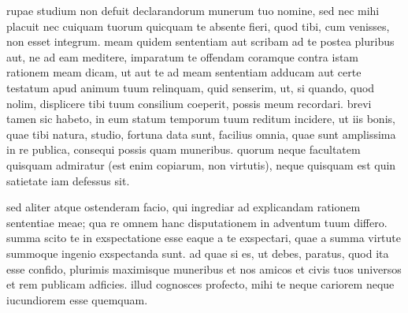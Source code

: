 


 rupae studium non defuit declarandorum munerum tuo nomine, sed nec mihi placuit nec cuiquam tuorum quicquam te absente fieri, quod tibi, cum venisses, non esset integrum. meam quidem sententiam aut scribam ad te postea pluribus aut, ne ad eam meditere, imparatum te offendam coramque contra istam rationem meam dicam, ut aut te ad meam sententiam adducam aut certe testatum apud animum tuum relinquam, quid senserim, ut, si quando, quod nolim, displicere tibi tuum consilium coeperit, possis meum recordari. brevi tamen sic habeto, in eum statum temporum tuum reditum incidere, ut iis bonis, quae tibi natura, studio, fortuna data sunt, facilius omnia, quae sunt amplissima in re publica, consequi possis quam muneribus. quorum neque facultatem quisquam admiratur (est enim copiarum, non virtutis), neque quisquam est quin satietate iam defessus sit.

 sed aliter atque ostenderam facio, qui ingrediar ad explicandam rationem sententiae meae; qua re omnem hanc disputationem in adventum tuum differo. summa scito te in exspectatione esse eaque a te exspectari, quae a summa virtute summoque ingenio exspectanda sunt. ad quae si es, ut debes, paratus, quod ita esse confido, plurimis maximisque muneribus et nos amicos et civis tuos universos et rem publicam adficies. illud cognosces profecto, mihi te neque cariorem neque iucundiorem esse quemquam.
